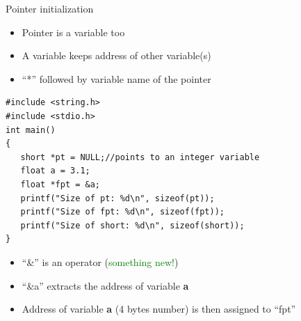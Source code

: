 \begin{frame}[fragile]{Pointer initialization}
\begin{itemize}
	\item {Pointer is a variable too}
	\item {A variable keeps address of other variable(s)}
	\item {``*'' followed by variable name of the pointer}
\end{itemize}
\begin{lstlisting}[xleftmargin=0.01\linewidth, linewidth=0.99\linewidth]
#include <string.h>
#include <stdio.h>
int main()
{
   short *pt = NULL;//points to an integer variable
   float a = 3.1;
   float *fpt = &a;
   printf("Size of pt: %d\n", sizeof(pt));
   printf("Size of fpt: %d\n", sizeof(fpt));
   printf("Size of short: %d\n", sizeof(short));
}
\end{lstlisting}
\vspace{-0.15in}
\begin{itemize}
	\item {``\&'' is an operator (\textcolor{green}{something new!})}
	\item {``\&a'' extracts the address of variable \textbf{a}}
	\item {Address of variable \textbf{a} (4 bytes number) is then assigned to ``fpt''}
\end{itemize}
\end{frame}

